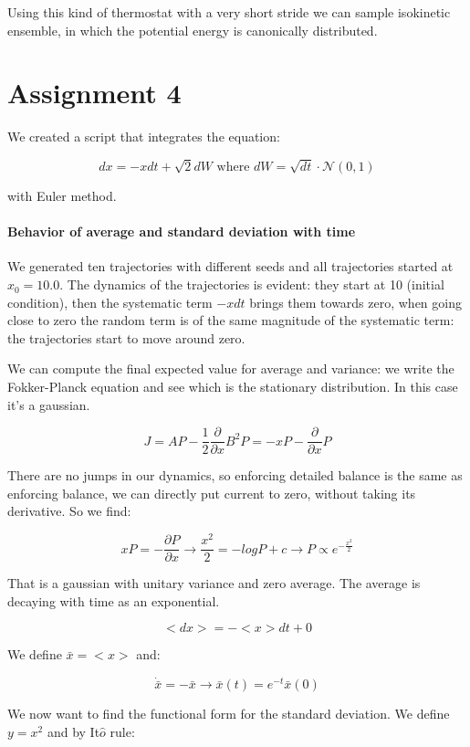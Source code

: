\documentclass[a4paper, italian, openany]{book}
\begin{document}
Using this kind of thermostat with a very short stride we can sample isokinetic ensemble, in which the potential energy is canonically distributed.

\section{Assignment 4}

We created a script that integrates the equation:

$$dx = -xdt+\sqrt{2}dW \mbox{ where } dW=\sqrt{dt}\cdot \mathcal{N}(0, 1)$$

with Euler method.

\paragraph{Behavior of average and standard deviation with time}

We generated ten trajectories with different seeds and all trajectories started at $x_0=10.0$.
The dynamics of the trajectories is evident: they start at 10 (initial condition), then the systematic term $-xdt$ brings them towards zero, when going close to zero the random term is of the same magnitude of the systematic term: the trajectories start to move around zero.

We can compute the final expected value for average and variance: we write the Fokker-Planck equation and see which is the stationary distribution. In this case it's a gaussian.

$$J=AP-\frac{1}{2}\frac{\partial}{\partial x}B^2 P = -xP -\frac{\partial}{\partial x}P$$

There are no jumps in our dynamics, so enforcing detailed balance is the same as enforcing balance, we can directly put current to zero, without taking its derivative. So we find:

$$xP = -\frac{\partial P}{\partial x} \rightarrow \frac{x^2}{2} = -logP + c \rightarrow P \propto e^{-\frac{x^2}{2}}$$

That is a gaussian with unitary variance and zero average. The average is decaying with time as an exponential.

$$<dx>=-<x>dt+0$$

We define $\bar{x}=<x>$ and:

$$\dot{\bar{x}} = -\bar{x} \rightarrow \bar{x}(t) = e^{-t} \bar{x}(0)$$

We now want to find the functional form for the standard deviation. We define $y=x^2$ and by It$\hat{o}$ rule:
\end{document}
